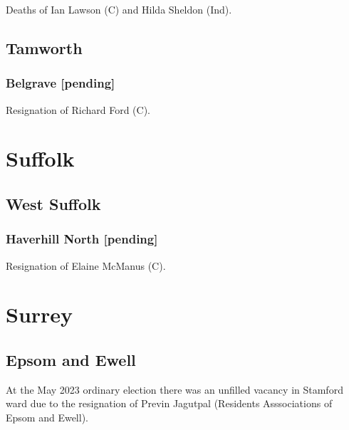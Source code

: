 \documentclass[a4paper,openany]{book}
\begin{document}
\begin{resultsiii}

Deaths of Ian Lawson (C) and Hilda Sheldon (Ind).

\subsection*{Tamworth}

\subsubsection*{Belgrave \hspace*{\fill}\nolinebreak[1]%
	\enspace\hspace*{\fill}
	[pending]}


Resignation of Richard Ford (C).

\section{Suffolk}

\subsection*{West Suffolk}

\subsubsection*{Haverhill North \hspace*{\fill}\nolinebreak[1]%
	\enspace\hspace*{\fill}
	[pending]}


Resignation of Elaine McManus (C).

\section{Surrey}

\subsection*{Epsom and Ewell}

At the May 2023 ordinary election there was an unfilled vacancy in Stamford ward due to the resignation of Previn Jagutpal (Residents Asssociations of Epsom and Ewell).%


\end{resultsiii}
\end{document}

